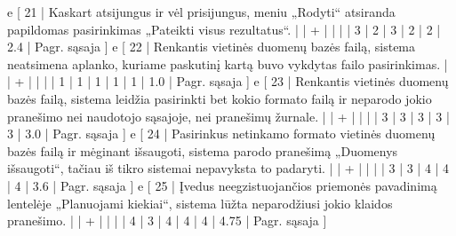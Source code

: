 {%
  e [ 21 | Kaskart atsijungus ir vėl prisijungus, meniu „Rodyti“ atsiranda papildomas
  pasirinkimas „Pateikti visus rezultatus“.
                    |   | + |   |   |   | 3 | 2 | 3 | 2 | 2 | 2.4  | Pagr. sąsaja ]
  e [ 22 | Renkantis vietinės duomenų bazės failą, sistema neatsimena aplanko,
  kuriame paskutinį kartą buvo vykdytas failo pasirinkimas.
                    |   | + |   |   |   | 1 | 1 | 1 | 1 | 1 | 1.0  | Pagr. sąsaja ]
  e [ 23 | Renkantis vietinės duomenų bazės failą, sistema leidžia pasirinkti
  bet kokio formato failą ir neparodo jokio pranešimo nei naudotojo sąsajoje,
  nei pranešimų žurnale.
                    |   | + |   |   |   | 3 | 3 | 3 | 3 | 3 | 3.0  | Pagr. sąsaja ]
  e [ 24 | Pasirinkus netinkamo formato vietinės duomenų bazės failą ir mėginant
  išsaugoti, sistema parodo pranešimą „Duomenys išsaugoti“, tačiau iš tikro sistemai
  nepavyksta to padaryti.
                    |   | + |   |   |   | 3 | 3 | 4 | 4 | 4 | 3.6  | Pagr. sąsaja ]
  e [ 25 | Įvedus neegzistuojančios priemonės pavadinimą lentelėje „Planuojami kiekiai“,
  sistema lūžta neparodžiusi jokio klaidos pranešimo.
                    |   | + |   |   |   | 4 | 3 | 4 | 4 | 4 | 4.75 | Pagr. sąsaja ]
}
